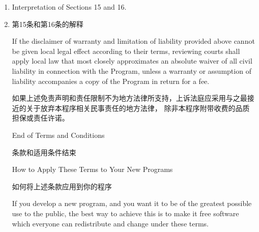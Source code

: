\documentclass[11pt]{article}
\begin{document}
\begin{enumerate}
        IN NO EVENT UNLESS REQUIRED BY APPLICABLE LAW OR AGREED TO IN
        WRITING WILL ANY COPYRIGHT HOLDER, OR ANY OTHER PARTY WHO MODIFIES
        AND/OR CONVEYS THE PROGRAM AS PERMITTED ABOVE, BE LIABLE TO YOU FOR
        DAMAGES, INCLUDING ANY GENERAL, SPECIAL, INCIDENTAL OR CONSEQUENTIAL
        DAMAGES ARISING OUT OF THE USE OR INABILITY TO USE THE PROGRAM
        (INCLUDING BUT NOT LIMITED TO LOSS OF DATA OR DATA BEING RENDERED
        INACCURATE OR LOSSES SUSTAINED BY YOU OR THIRD PARTIES OR A FAILURE
        OF THE PROGRAM TO OPERATE WITH ANY OTHER PROGRAMS), EVEN IF SUCH
        HOLDER OR OTHER PARTY HAS BEEN ADVISED OF THE POSSIBILITY OF SUCH
        DAMAGES.
        
        除非适用法律或书面协议要求，任何版权持有人或本程序按本许可证可能存在的第三方修改和再发布者，
        都不对你的损失负有责任，包括由于使用或者不能使用本程序造成的任何一般的、特殊的、偶发的或重大的损失
        （包括而不限于数据丢失、数据失真、你或第三方的后续损失、其他程序无法与本程序协同运作），即使有人声称会对此负责。

  \item Interpretation of Sections 15 and 16.
  
  \item 第15条和第16条的解释

        If the disclaimer of warranty and limitation of liability provided
        above cannot be given local legal effect according to their terms,
        reviewing courts shall apply local law that most closely approximates
        an absolute waiver of all civil liability in connection with the
        Program, unless a warranty or assumption of liability accompanies a
        copy of the Program in return for a fee.

        如果上述免责声明和责任限制不为地方法律所支持，上诉法庭应采用与之最接近的关于放弃本程序相关民事责任的地方法律，
        除非本程序附带收费的品质担保或责任许诺。


        \begin{center}
          {\Large\sc End of Terms and Conditions}

          {\Large 条款和适用条件结束}

          \bigskip
          How to Apply These Terms to Your New Programs

          如何将上述条款应用到你的程序
        \end{center}

        If you develop a new program, and you want it to be of the greatest
        possible use to the public, the best way to achieve this is to make it
        free software which everyone can redistribute and change under these terms.


\end{enumerate}
\end{document}
